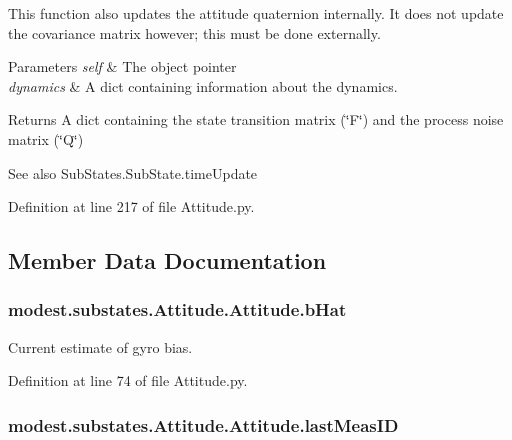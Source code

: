 This function also updates the attitude quaternion internally. It does not update the covariance matrix however; this must be done externally.


\begin{DoxyParams}{Parameters}
{\em self} & The object pointer \\
\hline
{\em dynamics} & A dict containing information about the dynamics.\\
\hline
\end{DoxyParams}
\begin{DoxyReturn}{Returns}
A dict containing the state transition matrix (\char`\"{}\+F\char`\"{}) and the process noise matrix (\char`\"{}\+Q\char`\"{})
\end{DoxyReturn}
\begin{DoxySeeAlso}{See also}
Sub\+States.\+Sub\+State.\+time\+Update 
\end{DoxySeeAlso}


Definition at line 217 of file Attitude.\+py.



\subsection{Member Data Documentation}
\subsubsection[{\texorpdfstring{b\+Hat}{bHat}}]{\setlength{\rightskip}{0pt plus 5cm}modest.\+substates.\+Attitude.\+Attitude.\+b\+Hat}\hypertarget{classmodest_1_1substates_1_1Attitude_1_1Attitude_a7d5607d83aae16c591f5b4f6da9cb9c0}{}\label{classmodest_1_1substates_1_1Attitude_1_1Attitude_a7d5607d83aae16c591f5b4f6da9cb9c0}


Current estimate of gyro bias. 



Definition at line 74 of file Attitude.\+py.

\subsubsection[{\texorpdfstring{last\+Meas\+ID}{lastMeasID}}]{\setlength{\rightskip}{0pt plus 5cm}modest.\+substates.\+Attitude.\+Attitude.\+last\+Meas\+ID}\hypertarget{classmodest_1_1substates_1_1Attitude_1_1Attitude_a719482b118c5a3a126663c1dc9c8b917}{}\label{classmodest_1_1substates_1_1Attitude_1_1Attitude_a719482b118c5a3a126663c1dc9c8b917}


